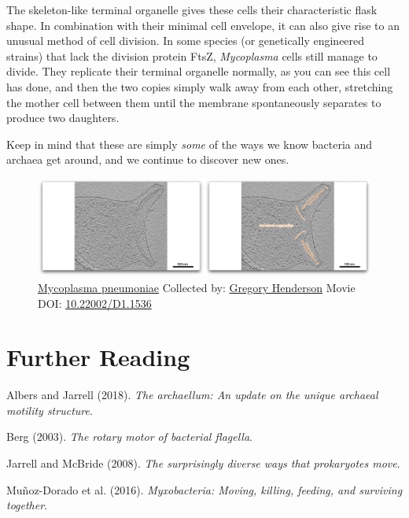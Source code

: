 \documentclass[]{tufte-book}
\begin{document}
The skeleton-like terminal organelle gives these cells their
characteristic flask shape. In combination with their minimal cell
envelope, it can also give rise to an unusual method of cell division.
In some species (or genetically engineered strains) that lack the
division protein FtsZ, \emph{Mycoplasma} cells still manage to divide.
They replicate their terminal organelle normally, as you can see this
cell has done, and then the two copies simply walk away from each other,
stretching the mother cell between them until the membrane spontaneously
separates to produce two daughters.

Keep in mind that these are simply \emph{some} of the ways we know
bacteria and archaea get around, and we continue to discover new ones.





\begin{figure}
\includegraphics{movie_stills/6_12} \caption[\protect\hyperlink{tree}{Mycoplasma pneumoniae} Collected by:
\protect\hyperlink{gregory_henderson}{Gregory Henderson} Movie DOI:
\href{https://doi.org/10.22002/D1.1536}{10.22002/D1.1536}]{\protect\hyperlink{tree}{Mycoplasma pneumoniae} Collected by:
\protect\hyperlink{gregory_henderson}{Gregory Henderson} Movie DOI:
\href{https://doi.org/10.22002/D1.1536}{10.22002/D1.1536}}\label{fig:6-12}
\end{figure}

\section{Further Reading}\label{further-reading}

Albers and Jarrell (2018). \emph{The archaellum: An update on the unique
archaeal motility structure}.\citep{albers2018}

Berg (2003). \emph{The rotary motor of bacterial
flagella}.\citep{berg2003}

Jarrell and McBride (2008). \emph{The surprisingly diverse ways that
prokaryotes move}.\citep{jarrell2008}

Muñoz-Dorado et al. (2016). \emph{Myxobacteria: Moving, killing,
feeding, and surviving together}.\citep{munoz-dorado2016}
\end{document}
